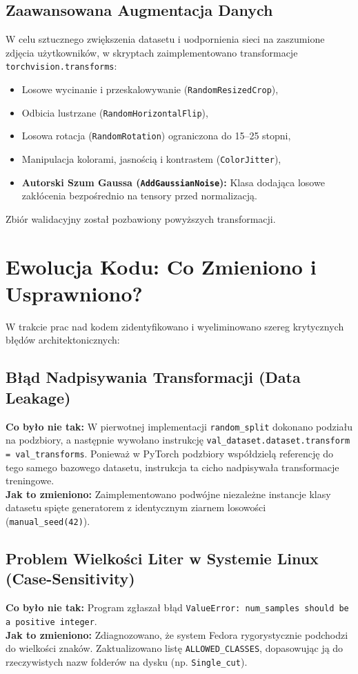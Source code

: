 \documentclass[12pt,a4paper]{article}
\begin{document}
\subsection{Zaawansowana Augmentacja Danych}
W celu sztucznego zwiększenia datasetu i uodpornienia sieci na zaszumione zdjęcia użytkowników, w skryptach zaimplementowano transformacje \texttt{torchvision.transforms}:
\begin{itemize}
    \item Losowe wycinanie i przeskalowywanie (\texttt{RandomResizedCrop}),
    \item Odbicia lustrzane (\texttt{RandomHorizontalFlip}),
    \item Losowa rotacja (\texttt{RandomRotation}) ograniczona do 15--25 stopni,
    \item Manipulacja kolorami, jasnością i kontrastem (\texttt{ColorJitter}),
    \item \textbf{Autorski Szum Gaussa (\texttt{AddGaussianNoise}):} Klasa dodająca losowe zakłócenia bezpośrednio na tensory przed normalizacją.
\end{itemize}
Zbiór walidacyjny został pozbawiony powyższych transformacji.

\section{Ewolucja Kodu: Co Zmieniono i Usprawniono?}

W trakcie prac nad kodem zidentyfikowano i wyeliminowano szereg krytycznych błędów architektonicznych:

\subsection{Błąd Nadpisywania Transformacji (Data Leakage)}
\textbf{Co było nie tak:} W pierwotnej implementacji \texttt{random\_split} dokonano podziału na podzbiory, a następnie wywołano instrukcję \texttt{val\_dataset.dataset.transform = val\_transforms}. Ponieważ w PyTorch podzbiory współdzielą referencję do tego samego bazowego datasetu, instrukcja ta cicho nadpisywała transformacje treningowe.\\
\textbf{Jak to zmieniono:} Zaimplementowano podwójne niezależne instancje klasy datasetu spięte generatorem z identycznym ziarnem losowości (\texttt{manual\_seed(42)}).

\subsection{Problem Wielkości Liter w Systemie Linux (Case-Sensitivity)}
\textbf{Co było nie tak:} Program zgłaszał błąd \texttt{ValueError: num\_samples should be a positive integer}.\\
\textbf{Jak to zmieniono:} Zdiagnozowano, że system Fedora rygorystycznie podchodzi do wielkości znaków. Zaktualizowano listę \texttt{ALLOWED\_CLASSES}, dopasowując ją do rzeczywistych nazw folderów na dysku (np. \texttt{Single\_cut}).
\end{document}
